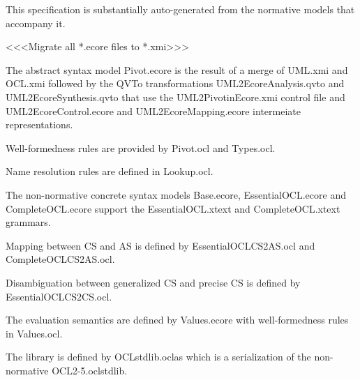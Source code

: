 \label{ocl:TheModels}

This specification is substantially auto-generated from the normative models that accompany it.

<<<Migrate all *.ecore files to *.xmi>>>


The abstract syntax model Pivot.ecore is the result of a merge of UML.xmi and OCL.xmi followed by the QVTo transformations UML2EcoreAnalysis.qvto and UML2EcoreSynthesis.qvto that use the UML2PivotinEcore.xmi control file and UML2EcoreControl.ecore and UML2EcoreMapping.ecore intermeiate representations.

Well-formedness rules are provided by Pivot.ocl and Types.ocl.

Name resolution rules are defined in Lookup.ocl.


The non-normative concrete syntax models Base.ecore, EssentialOCL.ecore and CompleteOCL.ecore support the EssentialOCL.xtext and CompleteOCL.xtext grammars.

Mapping between CS and AS is defined by EssentialOCLCS2AS.ocl and CompleteOCLCS2AS.ocl.

Disambiguation between generalized CS and precise CS is defined by EssentialOCLCS2CS.ocl.


The evaluation semantics are defined by Values.ecore with well-formedness rules in Values.ocl.


The library is defined by OCLstdlib.oclas which is a serialization of the non-normative OCL2-5.oclstdlib.